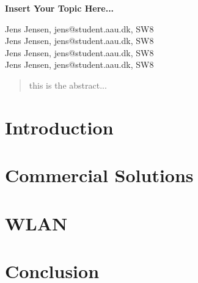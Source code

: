 \documentclass[12pt,a4paper]{article}
\begin{document}
\begin{center}
\bigskip\bigskip
{\Large\bf Insert Your Topic Here...}
\bigskip\bigskip


Jens Jensen, jens@student.aau.dk, SW8\\
Jens Jensen, jens@student.aau.dk, SW8\\
Jens Jensen, jens@student.aau.dk, SW8\\
Jens Jensen, jens@student.aau.dk, SW8

\bigskip
\begin{abstract}
this is the abstract...
\end{abstract}

\thispagestyle{empty}
\end{center}


\titlepage



\thispagestyle{plain}


\section{Introduction}

\section{Commercial Solutions}


\section{WLAN}


\section{Conclusion}




\end{document}
